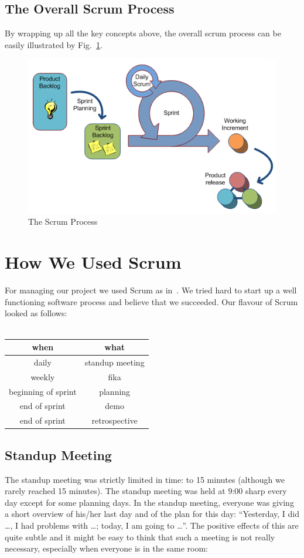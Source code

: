 \documentclass[11pt,a4paper]{report}
\begin{document}
\subsection{The Overall Scrum Process}
By wrapping up all the key concepts above, the overall scrum process can be easily
illustrated by Fig.~\ref{fig:scrum}.
\begin{figure}[h]
 \centering
 \includegraphics[width=12cm]{flags/scrum.png}
 \caption{The Scrum Process}
 \label{fig:scrum}
\end{figure}

\section{How We Used Scrum}
For managing our project we used Scrum as in~\cite{kniberg}.
We tried hard to start up a well functioning software process and believe that
we succeeded. Our flavour of Scrum looked as follows: \\ \\
\begin{tabular}{cc}
  when & what \\ \hline
  daily & standup meeting\\
  weekly & fika \\
  beginning of sprint & planning \\
  end of sprint & demo \\
  end of sprint & retrospective \\
\end{tabular}

\subsection{Standup Meeting}
The standup meeting was strictly limited in time: to 15 minutes (although we
rarely reached 15 minutes). The standup meeting was held at 9:00 sharp every day
except for some planning days. In the standup meeting, everyone was giving a
short overview of his/her last day and of the plan for this day: ``Yesterday, I
did \ldots, I had problems with \ldots; today, I am going to \ldots''.
The positive effects of this are quite subtle and it might be easy to think that
such a meeting is not really necessary, especially when everyone is in the same
room:
\end{document}
